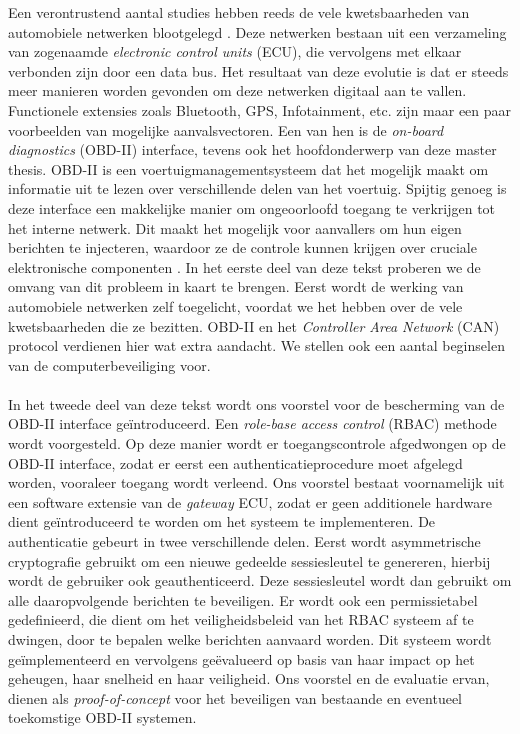 \documentclass[master=cws,masteroption=vs,english,extralanguage=dutch]{kulemt}
\begin{document}
\begin{abstract*}
\foreignlanguage{Dutch}{Een verontrustend aantal studies hebben reeds de vele kwetsbaarheden van automobiele netwerken blootgelegd \cite{Kosher,Kosher2,TPMS,MillerA,Pike15,Tuhoy,Pan,Petit}. Deze netwerken bestaan uit een verzameling van zogenaamde \textit{electronic control units} (ECU), die vervolgens met elkaar verbonden zijn door een data bus. Het resultaat van deze evolutie is dat er steeds meer manieren worden gevonden om deze netwerken digitaal aan te vallen. Functionele extensies zoals Bluetooth, GPS, Infotainment, etc. zijn maar een paar voorbeelden van mogelijke aanvalsvectoren. Een van hen is de \textit{on-board diagnostics} (OBD-II) interface, tevens ook het hoofdonderwerp van deze master thesis. OBD-II is een voertuigmanagementsysteem dat het mogelijk maakt om informatie uit te lezen over verschillende delen van het voertuig. Spijtig genoeg is deze interface een makkelijke manier om ongeoorloofd toegang te verkrijgen tot het interne netwerk. Dit maakt het mogelijk voor aanvallers om hun eigen berichten te injecteren, waardoor ze de controle kunnen krijgen over cruciale elektronische componenten \cite{MillerA,Yadav16,MillerB,MillerC}. In het eerste deel van deze tekst proberen we de omvang van dit probleem in kaart te brengen. Eerst wordt de werking van automobiele netwerken zelf toegelicht, voordat we het hebben over de vele kwetsbaarheden die ze bezitten. OBD-II en het \textit{Controller Area Network} (CAN) protocol verdienen hier wat extra aandacht. We stellen ook een aantal beginselen van de computerbeveiliging voor.} \\ \\ 
\foreignlanguage{Dutch}{In het tweede deel van deze tekst wordt ons voorstel voor de bescherming van de OBD-II interface ge\"{i}ntroduceerd. Een \textit{role-base access control} (RBAC) methode wordt voorgesteld. Op deze manier wordt er toegangscontrole afgedwongen op de OBD-II interface, zodat er eerst een authenticatieprocedure moet afgelegd worden, vooraleer toegang wordt verleend. Ons voorstel bestaat voornamelijk uit een software extensie van de \textit{gateway} ECU, zodat er geen additionele hardware dient ge\"{i}ntroduceerd te worden om het systeem te implementeren. De authenticatie gebeurt in twee verschillende delen. Eerst wordt asymmetrische cryptografie gebruikt om een nieuwe gedeelde sessiesleutel te genereren, hierbij wordt de gebruiker ook geauthenticeerd. Deze sessiesleutel wordt dan gebruikt om alle daaropvolgende berichten te beveiligen. Er wordt ook een permissietabel gedefinieerd, die dient om het veiligheidsbeleid van het RBAC systeem af te dwingen, door te bepalen welke berichten aanvaard worden. Dit systeem wordt ge\"{i}mplementeerd en vervolgens ge\"{e}valueerd op basis van haar impact op het geheugen, haar snelheid en haar veiligheid. Ons voorstel en de evaluatie ervan, dienen als \textit{proof-of-concept} voor het beveiligen van bestaande en eventueel toekomstige OBD-II systemen.}
\end{abstract*}
	
\end{document}
